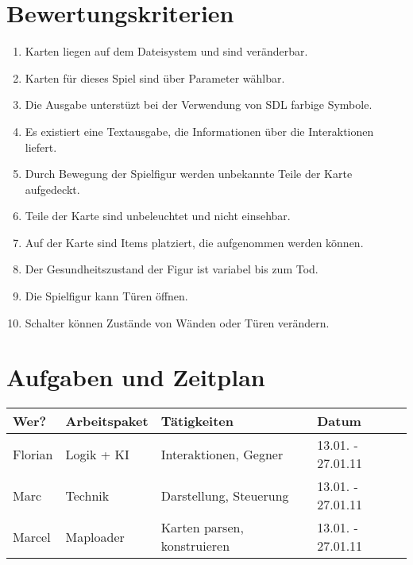 \documentclass[11pt,a4paper,notitlepage]{report}
\begin{document}
	\section*{Bewertungskriterien}
	\begin{enumerate}
	  \item Karten liegen auf dem Dateisystem und sind veränderbar.
		\item Karten für dieses Spiel sind über Parameter wählbar.
		\item Die Ausgabe unterstüzt bei der Verwendung von SDL farbige Symbole.
		\item Es existiert eine Textausgabe, die Informationen über die Interaktionen liefert.
		\item Durch Bewegung der Spielfigur werden unbekannte Teile der Karte aufgedeckt.
		\item Teile der Karte sind unbeleuchtet und nicht einsehbar.
		\item Auf der Karte sind Items platziert, die aufgenommen werden können.
		\item Der Gesundheitszustand der Figur ist variabel bis zum Tod.
		\item Die Spielfigur kann Türen öffnen.
		\item Schalter können Zustände von Wänden oder Türen verändern.
	\end{enumerate}
	
	\newpage
	\section*{Aufgaben und Zeitplan}

	\begin{tabular}{ p{3.5cm} | p{3.5cm} | p{5.0cm} | p{3.0cm} }
		Wer? & Arbeitspaket & Tätigkeiten & Datum \\
		\hline
		Florian & Logik + KI & Interaktionen, Gegner & 13.01. - 27.01.11 \\
		Marc & Technik & Darstellung, Steuerung & 13.01. - 27.01.11 \\
		Marcel & Maploader & Karten parsen, konstruieren & 13.01. - 27.01.11
	\end{tabular}
\end{document}
